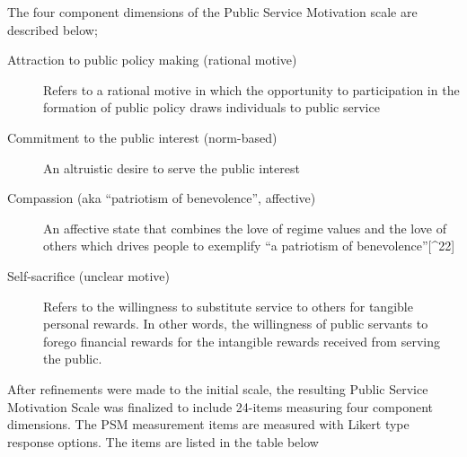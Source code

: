 \documentclass[
  11pt,
  a4paper,
]{article}
\begin{document}
The four component dimensions of the Public Service Motivation scale are
described below;

\begin{description}
\item[Attraction to public policy making (rational motive)]
Refers to a rational motive in which the opportunity to participation in
the formation of public policy draws individuals to public service
\item[Commitment to the public interest (norm-based)]
An altruistic desire to serve the public interest
\item[Compassion (aka ``patriotism of benevolence'', affective)]
An affective state that combines the love of regime values and the love
of others which drives people to exemplify ``a patriotism of
benevolence''{[}\^{}22{]}
\item[Self-sacrifice (unclear motive)]
Refers to the willingness to substitute service to others for tangible
personal rewards. In other words, the willingness of public servants to
forego financial rewards for the intangible rewards received from
serving the public.
\end{description}

After refinements were made to the initial scale, the resulting Public
Service Motivation Scale was finalized to include 24-items measuring
four component dimensions. The PSM measurement items are measured with
Likert type response options. The items are listed in the table below
\end{document}
